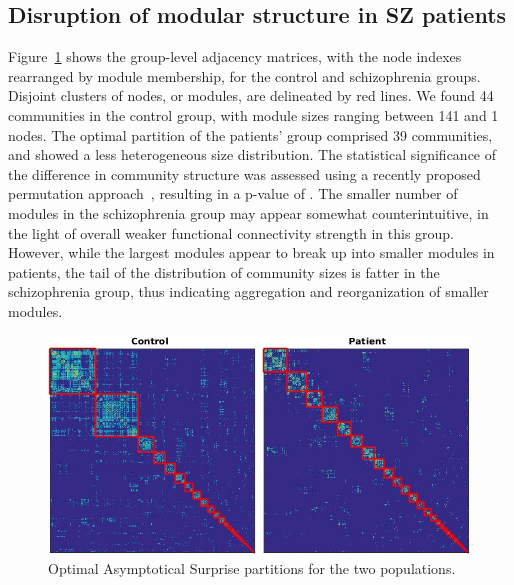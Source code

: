 \subsection{Disruption of modular structure in SZ patients}
Figure~\ref{fig:schizo_control_patients} shows the group-level adjacency matrices, with the node indexes rearranged by module membership, for the control and schizophrenia groups.
Disjoint clusters of nodes, or modules, are delineated by red lines.
We found 44 communities in the control group, with module sizes ranging between 141 and 1 nodes.
The optimal partition of the patients' group comprised 39 communities, and showed a less heterogeneous size distribution.
The statistical significance of the difference in community structure was assessed using a recently proposed permutation approach~\cite{alexander-bloch2012}, resulting in a p-value of .
The smaller number of modules in the schizophrenia group may appear somewhat counterintuitive, in the light of overall weaker functional connectivity strength in this group.
However, while the largest modules appear to break up into smaller modules in patients, the tail of the distribution of community sizes is fatter in the schizophrenia group, thus indicating aggregation and reorganization of smaller modules.
\begin{figure}[!htb]
\centering
\includegraphics[width=\textwidth]{images/schizo/schizo_fig_3.jpg}
\caption{Optimal Asymptotical Surprise partitions for the two populations.}
\label{fig:schizo_control_patients}
\end{figure}

